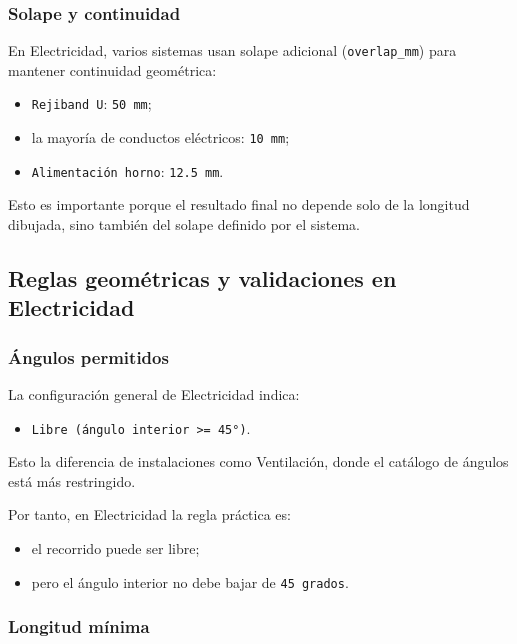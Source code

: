 \documentclass[12pt,a4paper]{article}
\begin{document}
\subsubsection{Solape y continuidad}

En Electricidad, varios sistemas usan solape adicional (\texttt{overlap\_mm}) para mantener continuidad geométrica:

\begin{itemize}
\item \texttt{Rejiband U}: \texttt{50 mm};
\item la mayoría de conductos eléctricos: \texttt{10 mm};
\item \texttt{Alimentación horno}: \texttt{12.5 mm}.
\end{itemize}

Esto es importante porque el resultado final no depende solo de la longitud dibujada, sino también del solape definido por el sistema.

\subsection{Reglas geométricas y validaciones en Electricidad}

\subsubsection{Ángulos permitidos}

La configuración general de Electricidad indica:

\begin{itemize}
\item \texttt{Libre (ángulo interior >= 45°)}.
\end{itemize}

Esto la diferencia de instalaciones como Ventilación, donde el catálogo de ángulos está más restringido.

Por tanto, en Electricidad la regla práctica es:

\begin{itemize}
\item el recorrido puede ser libre;
\item pero el ángulo interior no debe bajar de \texttt{45 grados}.
\end{itemize}

\subsubsection{Longitud mínima}
\end{document}
